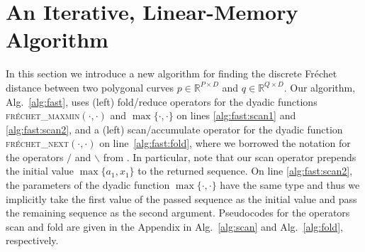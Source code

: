 \section{An Iterative, Linear-Memory Algorithm}
\label{sec:fast}
In this section we introduce a new algorithm for finding the discrete Fr\'echet distance between two polygonal curves $p \in \mathbb{R}^{P \times D}$ and $q \in \mathbb{R}^{Q \times D}$.
Our algorithm, Alg.~\ref{alg:fast}, uses (left) fold/reduce operators for the dyadic functions \textsc{fr\'echet\_maxmin}$(\cdot, \cdot)$ and $\max\{ \cdot, \cdot \}$ on lines \ref{alg:fast:scan1} and \ref{alg:fast:scan2}, and a (left) scan/accumulate operator for the dyadic function \textsc{fr\'echet\_next}$(\cdot, \cdot)$ on line~\ref{alg:fast:fold}, where we borrowed the notation for the operators $/$ and $\backslash$ from \citet{iverson62,iverson79}.
In particular, note that our scan operator prepends the initial value $\max\{ a_1, x_1 \}$ to the returned sequence.
On line \ref{alg:fast:scan2}, the parameters of the dyadic function $\max\{ \cdot, \cdot \}$ have the same type and thus we implicitly take the first value of the passed sequence as the initial value and pass the remaining sequence as the second argument.
Pseudocodes for the operators scan and fold are given in the Appendix in Alg.~\ref{alg:scan} and Alg.~\ref{alg:fold}, respectively.

